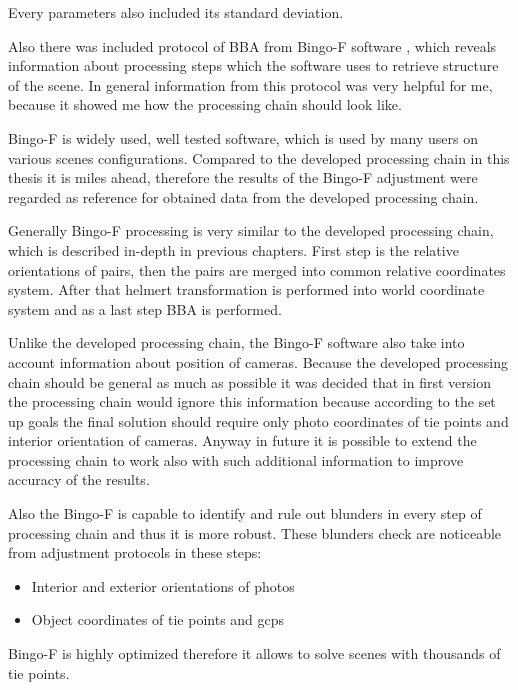 \documentclass[a4paper,12pt]{article}
\begin{document}
Every parameters also included its standard deviation. 

Also there was included protocol of BBA from Bingo-F software \cite{bingo2013gip}, which reveals 
information about processing steps which the software uses to retrieve structure of the scene.
In general information from this protocol was very helpful for me, because 
 it showed me how the processing chain should look like.

Bingo-F is widely used, well tested software, which is used by many users on various scenes configurations.  
Compared to the developed processing chain in this thesis it is miles ahead, therefore the results of the Bingo-F adjustment were 
regarded as reference for obtained data from the developed processing chain.

Generally Bingo-F processing is very similar to the developed  processing chain, which is  
described in-depth in previous chapters. First step is the relative orientations of pairs, then the pairs are merged into common relative 
coordinates system. After that helmert transformation is performed into world coordinate system and as a last step BBA is performed.

Unlike the developed processing chain,  the Bingo-F software also take into account information about position of cameras. 
Because the developed processing chain should be general as much as possible it was decided that in first version  the processing chain would ignore this 
information because according to the set up goals the final solution should require only photo coordinates of tie points and interior 
orientation of cameras. Anyway in future it is possible to extend the processing chain to work also with such additional information to improve accuracy 
of the results. 

Also the Bingo-F is capable to identify and rule out blunders in every step of processing chain and thus it is more robust.
These blunders check are noticeable from adjustment protocols in these steps:
\begin{itemize}
\item Interior and exterior orientations of photos
\item Object coordinates of tie points and gcps
\end{itemize}



Bingo-F is highly optimized therefore it allows to solve scenes with thousands of tie points.
\end{document}

